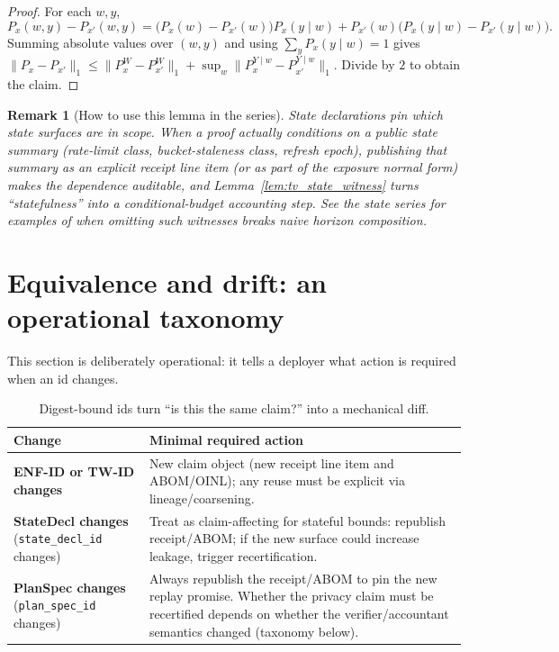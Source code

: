 \documentclass[11pt]{article}
\newtheorem{remark}{Remark}
\begin{document}
\begin{proof}
For each $w,y$,
\[
P_x(w,y)-P_{x'}(w,y)=\big(P_x(w)-P_{x'}(w)\big)P_x(y\mid w)+P_{x'}(w)\big(P_x(y\mid w)-P_{x'}(y\mid w)\big).
\]
Summing absolute values over $(w,y)$ and using $\sum_y P_x(y\mid w)=1$ gives
$\|P_x-P_{x'}\|_1 \le \|P_x^W-P_{x'}^W\|_1 + \sup_w \|P_x^{Y\mid w}-P_{x'}^{Y\mid w}\|_1$.
Divide by $2$ to obtain the claim.
\end{proof}

\begin{remark}[How to use this lemma in the series]
State \emph{declarations} pin which state surfaces are in scope.
When a proof actually conditions on a public state summary (rate-limit class, bucket-staleness class, refresh epoch),
publishing that summary as an explicit receipt line item (or as part of the exposure normal form) makes the dependence auditable,
and Lemma~\ref{lem:tv_state_witness} turns ``statefulness'' into a conditional-budget accounting step.
See the state series for examples of when omitting such witnesses breaks naive horizon composition.\cite{series:state1}
\end{remark}


\section{Equivalence and drift: an operational taxonomy}
This section is deliberately operational: it tells a deployer what action is required when an id changes.

\begin{table}[t]
\centering
\small
\begin{tabularx}{\linewidth}{@{}lX@{}}
\toprule
Change & Minimal required action \\
\midrule
\textbf{ENF-ID or TW-ID changes} & New claim object (new receipt line item and ABOM/OINL); any reuse must be explicit via lineage/coarsening.\cite{series:traceifaces,series:threatwindows}\\
\textbf{StateDecl changes} (\texttt{state\_decl\_id} changes) & Treat as claim-affecting for stateful bounds: republish receipt/ABOM; if the new surface could increase leakage, trigger recertification.\cite{series:state1,series:recert}\\
\textbf{PlanSpec changes} (\texttt{plan\_spec\_id} changes) & Always republish the receipt/ABOM to pin the new replay promise. Whether the privacy claim must be recertified depends on whether the verifier/accountant semantics changed (taxonomy below).\\
\bottomrule
\end{tabularx}
\caption{Digest-bound ids turn ``is this the same claim?'' into a mechanical diff.}
\label{tab:diff}
\end{table}
\end{document}
